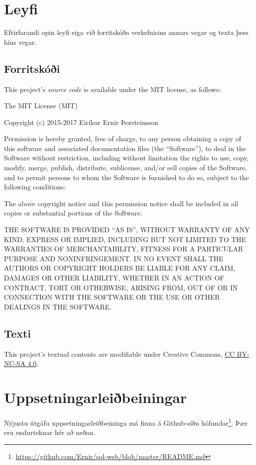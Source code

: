 \documentclass[a4paper,12pt,twoside,BCOR=10mm]{scrbook}
\begin{document}
\chapter{Leyfi}
\label{sec:license}
Eftirfarandi opin leyfi eiga við forritskóða verkefnisins annars vegar og texta þess hins vegar.
\section{Forritskóði}\label{code}

This project's \emph{source code} is available under the MIT license, as
follows:

The MIT License (MIT)

Copyright (c) 2015-2017 Eiríkur Ernir Þorsteinsson

Permission is hereby granted, free of charge, to any person obtaining a
copy of this software and associated documentation files (the
``Software''), to deal in the Software without restriction, including
without limitation the rights to use, copy, modify, merge, publish,
distribute, sublicense, and/or sell copies of the Software, and to
permit persons to whom the Software is furnished to do so, subject to
the following conditions:

The above copyright notice and this permission notice shall be included
in all copies or substantial portions of the Software.

THE SOFTWARE IS PROVIDED ``AS IS'', WITHOUT WARRANTY OF ANY KIND,
EXPRESS OR IMPLIED, INCLUDING BUT NOT LIMITED TO THE WARRANTIES OF
MERCHANTABILITY, FITNESS FOR A PARTICULAR PURPOSE AND NONINFRINGEMENT.
IN NO EVENT SHALL THE AUTHORS OR COPYRIGHT HOLDERS BE LIABLE FOR ANY
CLAIM, DAMAGES OR OTHER LIABILITY, WHETHER IN AN ACTION OF CONTRACT,
TORT OR OTHERWISE, ARISING FROM, OUT OF OR IN CONNECTION WITH THE
SOFTWARE OR THE USE OR OTHER DEALINGS IN THE SOFTWARE.

\section{Texti}\label{contents}

This project's textual contents are modifiable under Creative Commons,
\href{http://creativecommons.org/licenses/by-nc-sa/4.0/}{CC BY-NC-SA
4.0}.

\chapter{Uppsetningarleiðbeiningar}
\label{sec:installation}
Nýjustu útgáfu uppsetningarleiðbeininga má finna á Github-síðu höfundar\footnote{\url{https://github.com/Ernir/sql-web/blob/master/README.md}}. Þær eru endurteknar hér að neðan.


\end{document}
